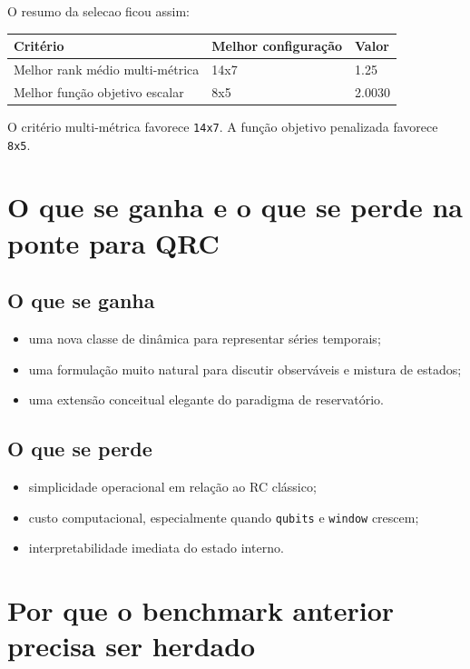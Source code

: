 \documentclass[12pt]{article}
\providecommand{\tightlist}{%
              \setlength{\itemsep}{0pt}\setlength{\parskip}{0pt}}
\begin{document}
O resumo da selecao ficou assim:

\begin{longtable}[]{@{}lll@{}}
\toprule\noalign{}
Critério & Melhor configuração & Valor \\
\midrule\noalign{}
\endhead
\bottomrule\noalign{}
\endlastfoot
Melhor rank médio multi-métrica & 14x7 & 1.25 \\
Melhor função objetivo escalar & 8x5 & 2.0030 \\
\end{longtable}

O critério multi-métrica favorece \texttt{14x7}. A função objetivo penalizada favorece \texttt{8x5}.

\section{O que se ganha e o que se perde na ponte para QRC}\label{8-o-que-se-ganha-e-o-que-se-perde-na-ponte-para-qrc}

\subsection{O que se ganha}\label{81-o-que-se-ganha}

\begin{itemize}
\tightlist
\item
  uma nova classe de dinâmica para representar séries temporais;
\item
  uma formulação muito natural para discutir observáveis e mistura de estados;
\item
  uma extensão conceitual elegante do paradigma de reservatório.
\end{itemize}

\subsection{O que se perde}\label{82-o-que-se-perde}

\begin{itemize}
\tightlist
\item
  simplicidade operacional em relação ao RC clássico;
\item
  custo computacional, especialmente quando \texttt{qubits} e \texttt{window} crescem;
\item
  interpretabilidade imediata do estado interno.
\end{itemize}

\section{Por que o benchmark anterior precisa ser herdado}\label{9-por-que-o-benchmark-anterior-precisa-ser-herdado}
\end{document}
